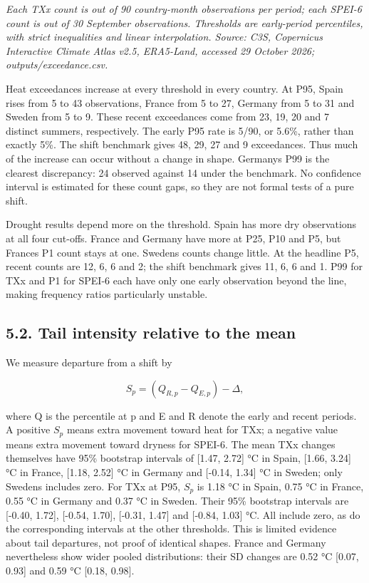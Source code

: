 \documentclass[
  10pt,
]{article}
\begin{document}
\emph{Each TXx count is out of 90 country-month observations per period;
each SPEI-6 count is out of 30 September observations. Thresholds are
early-period percentiles, with strict inequalities and linear
interpolation. Source: C3S, Copernicus Interactive Climate Atlas v2.5,
ERA5-Land, accessed 29 October 2026; outputs/exceedance.csv.}

Heat exceedances increase at every threshold in every country. At P95,
Spain rises from 5 to 43 observations, France from 5 to 27, Germany from
5 to 31 and Sweden from 5 to 9. These recent exceedances come from 23,
19, 20 and 7 distinct summers, respectively. The early P95 rate is 5/90,
or 5.6\%, rather than exactly 5\%. The shift benchmark gives 48, 29, 27
and 9 exceedances. Thus much of the increase can occur without a change
in shape. Germany\textquotesingle s P99 is the clearest discrepancy: 24
observed against 14 under the benchmark. No confidence interval is
estimated for these count gaps, so they are not formal tests of a pure
shift.

Drought results depend more on the threshold. Spain has more dry
observations at all four cut-offs. France and Germany have more at P25,
P10 and P5, but France\textquotesingle s P1 count stays at one.
Sweden\textquotesingle s counts change little. At the headline P5,
recent counts are 12, 6, 6 and 2; the shift benchmark gives 11, 6, 6 and
1. P99 for TXx and P1 for SPEI-6 each have only one early observation
beyond the line, making frequency ratios particularly unstable.

\subsection{5.2. Tail intensity relative to the
mean}\label{tail-intensity-relative-to-the-mean}

We measure departure from a shift by

\[S_{p} = (Q_{R,p} - Q_{E,p}) - \Delta,\]

where Q is the percentile at p and E and R denote the early and recent
periods. A positive \(S_p\) means extra movement toward heat for TXx; a
negative value means extra movement toward dryness for SPEI-6. The mean
TXx changes themselves have 95\% bootstrap intervals of
{[}1.47, 2.72{]} °C in Spain, {[}1.66, 3.24{]} °C in France, {[}1.18,
2.52{]} °C in Germany and {[}-0.14, 1.34{]} °C in Sweden; only
Sweden\textquotesingle s includes zero. For TXx
at P95, \(S_p\) is 1.18 °C in Spain, 0.75 °C in France, 0.55 °C in Germany
and 0.37 °C in Sweden. Their 95\% bootstrap intervals are {[}-0.40,
1.72{]}, {[}-0.54, 1.70{]}, {[}-0.31, 1.47{]} and {[}-0.84, 1.03{]} °C.
All include zero, as do the corresponding intervals at the other
thresholds. This is limited evidence about tail departures, not proof of
identical shapes. France and Germany nevertheless show wider pooled
distributions: their SD changes are 0.52 °C {[}0.07, 0.93{]} and 0.59 °C
{[}0.18, 0.98{]}.
\end{document}
